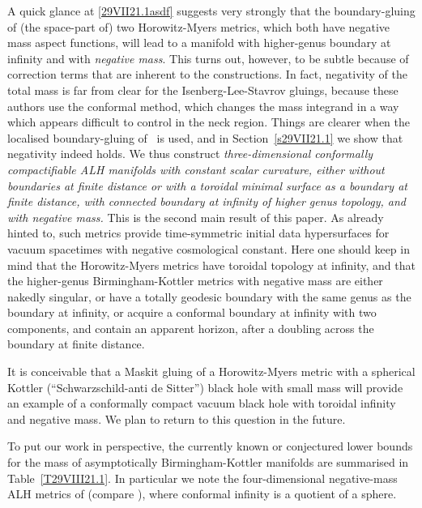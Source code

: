 \documentclass[a4paper,10pt]{article}
\newcounter{mnotecount}[section]
\renewcommand{\themnotecount}{\thesection.\arabic{mnotecount}}
\newcommand{\mnote}[1]%
{\protect{\stepcounter{mnotecount}}$^{\mbox{\footnotesize
$%
\bullet$\themnotecount}}$ \marginpar{%
\raggedright\tiny\em
$\!\!\!\!\!\!\,\bullet$\themnotecount: #1} }
\newcommand{\ptcr}[1]{{\color{red}\mnote{{\color{red}{\bf ptc:}
#1} }}}
\begin{document}
A quick glance at \eqref{29VII21.1asdf}
suggests very strongly that the boundary-gluing of (the space-part of) two Horowitz-Myers metrics, which both have negative mass aspect functions, will lead to a manifold with higher-genus boundary at infinity and with \emph{negative mass}.
This turns out, however, to be subtle because of correction terms that are inherent to the constructions.
In fact, negativity of the total mass is far from clear for the Isenberg-Lee-Stavrov gluings, because these authors use the conformal method,
which changes the mass integrand
in a way which appears difficult to control  in the neck region.
Things are clearer when the localised boundary-gluing of~\cite{ChDelayExotic} is used, and in Section~\ref{s29VII21.1} we show that negativity indeed holds.
 We thus construct \emph{three-dimensional conformally compactifiable ALH manifolds with constant scalar curvature,   either without boundaries at finite distance or with a toroidal minimal surface as a boundary at finite distance, with connected boundary at infinity of higher genus topology, and with negative mass.}
  This is the second main result of this paper. As already hinted to, such metrics provide time-symmetric initial data hypersurfaces for vacuum spacetimes with negative cosmological constant. Here one should keep in mind that the Horowitz-Myers metrics have toroidal topology at infinity, and that the  higher-genus Birmingham-Kottler metrics with negative mass are either nakedly singular, or have a totally geodesic boundary with the same genus as the boundary at infinity, or acquire a conformal boundary at infinity with  two components, and contain an apparent horizon, after a doubling across the boundary at finite distance.

It is  conceivable   that a Maskit gluing of a Horowitz-Myers metric with a spherical Kottler (``Schwarzschild-anti de Sitter'') black hole with  small mass will provide an example of a conformally compact vacuum black hole with toroidal infinity and negative mass.   We plan to return to this question in the future.

  To put our work in perspective,  the currently known or conjectured lower bounds for the mass of asymptotically Birmingham-Kottler manifolds are summarised in Table~\ref{T29VIII21.1}. In particular we note the four-dimensional negative-mass ALH metrics of \cite{PedersenEH,Clarkson:2006zk} (compare \cite{ChenZhang,DoldNegativeMass}),
 where conformal infinity is a quotient of a sphere.
\end{document}
